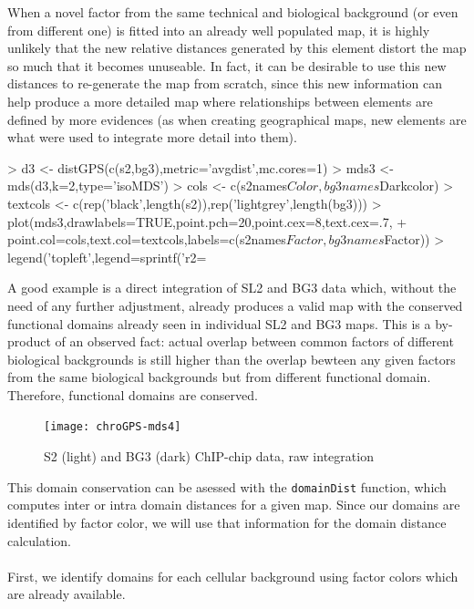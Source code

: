 \documentclass[a4paper,12pt,nogin]{article}
\begin{document}
When a novel factor from the same technical and biological
background (or even from different one) is fitted into an already well populated map, it is highly
unlikely that the new relative distances generated by this element
distort the map so much that it becomes unuseable. In fact, it can be
desirable to use this new distances to re-generate the map from
scratch, since this new information can help produce a more detailed
map where relationships between elements are defined by more evidences (as when creating geographical maps, new elements are what were used to integrate more detail into them).
 
\footnotesize
 
\begin{Schunk}
\begin{Sinput}
> d3 <- distGPS(c(s2,bg3),metric='avgdist',mc.cores=1)
> mds3 <- mds(d3,k=2,type='isoMDS')
> cols <- c(s2names$Color,bg3names$Darkcolor)
> textcols <- c(rep('black',length(s2)),rep('lightgrey',length(bg3)))
> plot(mds3,drawlabels=TRUE,point.pch=20,point.cex=8,text.cex=.7,
+ point.col=cols,text.col=textcols,labels=c(s2names$Factor,bg3names$Factor))
> legend('topleft',legend=sprintf('r2=%
\end{Sinput}
\end{Schunk}
 
\normalsize
 
A good example is a direct integration of SL2 and BG3 data which, without the need of any further adjustment, already produces a valid map with the conserved functional domains already seen in individual SL2 and BG3 maps. This is a by-product of an observed fact: actual overlap between common factors of different biological backgrounds is still higher than the overlap bewteen any given factors from the same biological backgrounds but from different functional domain. Therefore, functional domains are conserved.
 
\begin{figure}
\begin{center}
\texttt{[image: chroGPS-mds4]}
\end{center}
\caption{S2 (light) and BG3 (dark) ChIP-chip data, raw integration}
\label{fig:mds4}
\end{figure}
 
This domain conservation can be asessed with the \texttt{domainDist}
function, which computes inter or intra domain distances for a given
map. Since our domains are identified by factor color, we will use
that information for the domain distance calculation.
\\\\
First, we identify domains for each cellular background using factor colors which are already available.
\end{document}
